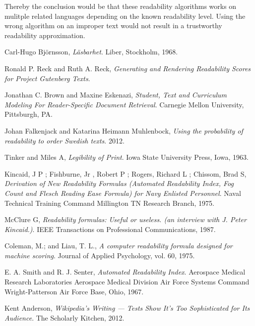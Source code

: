 \documentclass[a4paper]{article}
\begin{document}
Thereby the conclusion would be that these readability algorithms works on mulitple related languages depending on the known readability level. Using the wrong algorithm on an improper text would not result in a trustworthy readability approximation. 

\newpage
\begin{thebibliography}{99}

  Carl-Hugo Björnsson,
  \emph{Läsbarhet}.
  Liber, Stockholm,
  1968.
  
  Ronald P. Reck and Ruth A. Reck,
  \emph{Generating and Rendering Readability Scores for Project Gutenberg Texts}.
  
  Jonathan C. Brown and Maxine Eskenazi,
  \emph{Student, Text and Curriculum Modeling For Reader-Specific Document Retrieval}.
  Carnegie Mellon University,
  Pittsburgh, PA.

  Johan Falkenjack and Katarina Heimann Muhlenbock,
  \emph{Using the probability of readability to order Swedish texts}.
  2012.
  
  Tinker and Miles A,
  \emph{Legibility of Print}.
  Iowa State University Press, Iowa,
  1963.
  
  Kincaid, J P ; Fishburne, Jr , Robert P ; Rogers, Richard L ; Chissom, Brad S,
  \emph{Derivation of New Readability Formulas (Automated Readability Index, Fog Count and Flesch Reading Ease Formula) for Navy Enlisted Personnel}.
  Naval Technical Training Command Millington TN Research Branch,
  1975.

  McClure G,
  \emph{Readability formulas: Useful or useless. (an interview with J. Peter Kincaid.)}.
  IEEE Transactions on Professional Communications,
  1987.

  Coleman, M.; and Liau, T. L.,
  \emph{A computer readability formula designed for machine scoring}.
  Journal of Applied Psychology,
  vol. 60,
  1975.
  
  E. A. Smith and R. J. Senter,
  \emph{Automated Readability Index}.
  Aerospace Medical Research Laboratories
Aerospace Medical Division
Air Force Systems Command
Wright-Patterson Air Force Base, Ohio,
  1967.

  Kent Anderson,
  \emph{Wikipedia’s Writing — Tests Show It’s Too Sophisticated for Its Audience}.
  The Scholarly Kitchen,
  2012.


\end{thebibliography}
\end{document}
